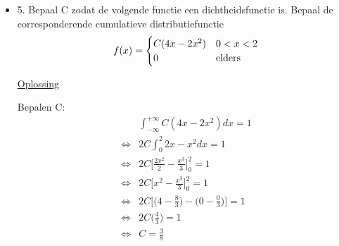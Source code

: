 \documentclass[12pt]{report}
\newcommand{\exercise}[2]{
  #1
  

  \underline{Oplossing}
  
  #2
  
    \hrulefill
}
\begin{document}
\begin{itemize}
{{}}
 \item{\exercise{5. Bepaal C zodat de volgende functie een dichtheidsfunctie is. Bepaal de corresponderende cumulatieve distributiefunctie
 $$f(x) = \begin{cases}
           C(4x - 2x^2) & 0 < x < 2 \\
           0 & \hbox{elders}
          \end{cases}
$$}{
Bepalen C:
\begin{equation*}
 \begin{split}
  & \int_{-\infty}^{+\infty}C(4x-2x^2)dx = 1 \\
  \Leftrightarrow & 2C\int_{0}^{2}2x-x^2dx = 1 \\
  \Leftrightarrow & 2C\bigg[\frac{2x^2}{2} - \frac{x^3}{3}\bigg]_0^2 = 1 \\
  \Leftrightarrow & 2C\bigg[x^2 - \frac{x^3}{3}\bigg]_0^2 = 1 \\
  \Leftrightarrow & 2C\bigg[\bigg(4 - \frac{8}{3}\bigg) - \bigg(0 - \frac{0}{3}\bigg)\bigg]= 1 \\
  \Leftrightarrow & 2C\bigg(\frac{4}{3}\bigg)= 1 \\
  \Leftrightarrow & C = \frac{3}{8}
 \end{split}
\end{equation*}

}}
\end{itemize}
\end{document}
